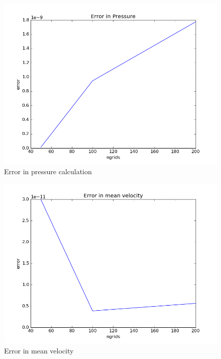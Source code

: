 \documentclass[11pt, a4paper]{article}
\begin{document}
\begin{figure}[H]
 \centering
 \includegraphics[scale = 0.5]{Error_p.png}
 \caption{Error in pressure calculation}
 \label{fig:pressure error}
\end{figure}

\begin{figure}[H]
 \centering
 \includegraphics[scale = 0.5]{Error_v.png}
 \caption{Error in mean velocity}
 \label{fig:vmean error}
\end{figure}
\end{document}
